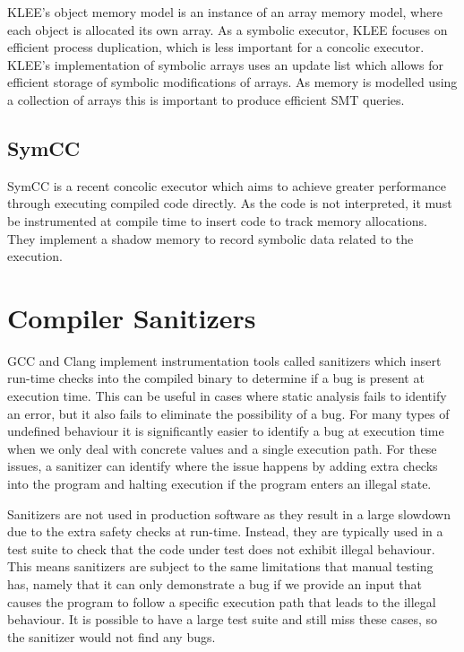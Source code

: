 \documentclass[12pt,twoside]{report}
\begin{document}
KLEE's object memory model is an instance of an array memory model, where each object is allocated its own array. As a symbolic executor, KLEE focuses on efficient process duplication, which is less important for a concolic executor. KLEE's implementation of symbolic arrays uses an update list which allows for efficient storage of symbolic modifications of arrays. As memory is modelled using a collection of arrays this is important to produce efficient SMT queries.

\subsection{SymCC}
 SymCC \cite{poeplau2020symbolic} is a recent concolic executor which aims to achieve greater performance through executing compiled code directly. As the code is not interpreted, it must be instrumented at compile time to insert code to track memory allocations. They implement a shadow memory to record symbolic data related to the execution. 


\section{Compiler Sanitizers}
GCC and Clang implement instrumentation tools called sanitizers which insert run-time checks into the compiled binary to determine if a bug is present at execution time. This can be useful in cases where static analysis fails to identify an error, but it also fails to eliminate the possibility of a bug. For many types of undefined behaviour it is significantly easier to identify a bug at execution time when we only deal with concrete values and a single execution path. For these issues, a sanitizer can identify where the issue happens by adding extra checks into the program and halting execution if the program enters an illegal state.

Sanitizers are not used in production software as they result in a large slowdown due to the extra safety checks at run-time. Instead, they are typically used in a test suite to check that the code under test does not exhibit illegal behaviour. This means sanitizers are subject to the same limitations that manual testing has, namely that it can only demonstrate a bug if we provide an input that causes the program to follow a specific execution path that leads to the illegal behaviour. It is possible to have a large test suite and still miss these cases, so the sanitizer would not find any bugs.
\end{document}
